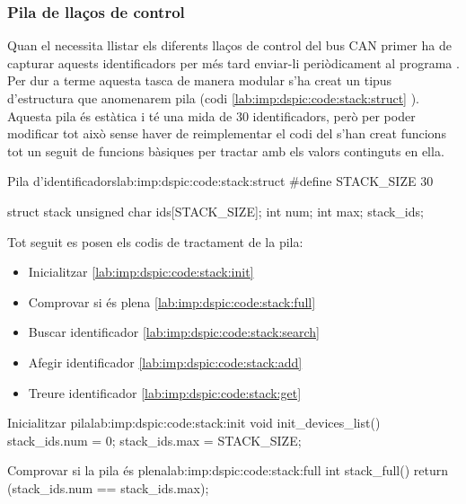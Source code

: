 \subsubsection{Pila de llaços de control}\label{lab:imp:dspic:monitor:can:stack}

Quan el \Monitor necessita llistar els diferents llaços de control del bus CAN primer ha de capturar aquests identificadors per més tard enviar-li periòdicament al programa \DCSMonitor. Per dur a terme aquesta tasca de manera modular s'ha creat un tipus d'estructura que anomenarem pila (codi \ref{lab:imp:dspic:code:stack:struct} ).
Aquesta pila és estàtica i té una mida de 30 identificadors, però per poder modificar tot això sense haver de reimplementar el codi del \Monitor s'han creat funcions tot un seguit de funcions bàsiques per tractar amb els valors continguts en ella.

\begin{code_c}{Pila d'identificadors}{lab:imp:dspic:code:stack:struct}
#define STACK_SIZE 30

struct stack{
	unsigned char ids[STACK_SIZE];
	int num;
	int max;
}stack_ids;
\end{code_c}


Tot seguit es posen els codis de tractament de la pila:

\begin{itemize}
	\item Inicialitzar \ref{lab:imp:dspic:code:stack:init}
	\item Comprovar si és plena \ref{lab:imp:dspic:code:stack:full}
	\item Buscar identificador \ref{lab:imp:dspic:code:stack:search}
	\item Afegir identificador \ref{lab:imp:dspic:code:stack:add}
	\item Treure identificador \ref{lab:imp:dspic:code:stack:get}
\end{itemize}

\begin{code_c}{Inicialitzar pila}{lab:imp:dspic:code:stack:init}
void init_devices_list()
{
	stack_ids.num = 0;
	stack_ids.max = STACK_SIZE;
}
\end{code_c}

\begin{code_c}{Comprovar si la pila és plena}{lab:imp:dspic:code:stack:full}
int stack_full()
{
	return (stack_ids.num == stack_ids.max);
}
\end{code_c}

